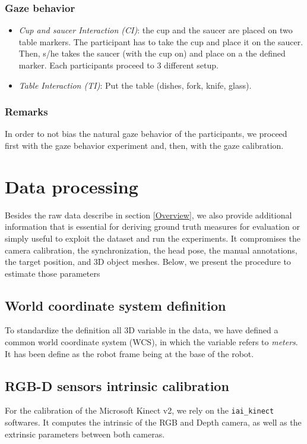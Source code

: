 \documentclass[11pt,a4paper]{article}
\begin{document}
\subsubsection{Gaze behavior}
\begin{itemize}
\item \textit{Cup and saucer Interaction (CI)}: the cup and the saucer are placed on two table markers. The participant has to take the cup and place it on the saucer. Then, s/he takes the saucer (with the cup on) and place on a the defined marker. Each participants proceed to 3 different setup.
\item \textit{Table Interaction (TI)}: Put the table (dishes, fork, knife, glass).
\end{itemize}

\subsubsection{Remarks}
In order to not bias the natural gaze behavior of the participants, we proceed first with the gaze behavior experiment and, then, with the gaze calibration.

\section{Data processing}
Besides the raw data describe in section \ref{Overview}, we also provide additional information that is essential for deriving ground truth measures for evaluation or simply useful to exploit the dataset and run the experiments. It compromises the camera calibration, the synchronization, the head pose, the manual annotations, the target position, and 3D object meshes. Below, we present the procedure to estimate those parameters

\subsection{World coordinate system definition}
To standardize the definition all 3D variable in the data, we have defined a common world coordinate system (WCS), in which the variable refers to \textit{meters}. It has been define as the robot frame being at the base of the robot.

\subsection{RGB-D sensors intrinsic calibration}
For the calibration of the Microsoft Kinect v2, we rely on the \texttt{iai\_kinect} softwares. It computes the intrinsic of the RGB and Depth camera, as well as the extrinsic parameters between both cameras.
\end{document}
